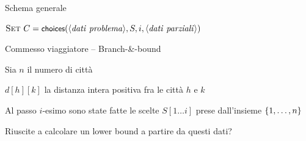 \begin{frame}{Schema generale}

\vspace{-12pt}
\begin{Procedure}
\caption[A]{\branchbound($\langle \mathit{dati\ problema} \rangle$, $\Item[\,]\ S$, \INTEGER\ $i$, $\langle \mathit{dati\ parziali} \rangle$)}
$\textsc{Set}\ C = \textsf{{\small choices}}(\langle \mathit{dati\ problema} \rangle, S, i, \langle \mathit{dati\ parziali} \rangle)$\;
\end{Procedure}

\end{frame}

\begin{frame}{Commesso viaggiatore -- Branch-\&-bound}

\vspace{-9pt}
\begin{myboxtitle}
\BIL
\item Sia $n$ il numero di città
\item $d[h][k]$ la distanza intera positiva fra le città $h$ e $k$
\item Al passo $i$-esimo sono state fatte le scelte $S[1 \ldots i]$ 
prese dall'insieme $\{1, \ldots, n\}$
\EIL
\end{myboxtitle}

\begin{myboxtitle}
Riuscite a calcolare un lower bound a partire da questi dati?
\end{myboxtitle}

\end{frame}


